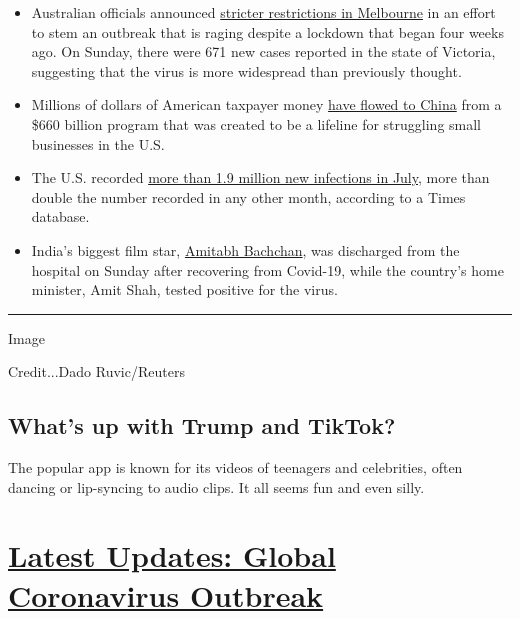 \begin{itemize}
\item
  Australian officials announced
  \href{https://www.nytimes3xbfgragh.onion/2020/08/02/world/coronavirus-covid-19.html?action=click\&module=Top\%20Stories\&pgtype=Homepage\#link-74f9a2b2}{stricter
  restrictions in Melbourne} in an effort to stem an outbreak that is
  raging despite a lockdown that began four weeks ago. On Sunday, there
  were 671 new cases reported in the state of Victoria, suggesting that
  the virus is more widespread than previously thought.
\item
  Millions of dollars of American taxpayer money
  \href{https://www.nytimes3xbfgragh.onion/2020/08/02/us/politics/virus-china-ppp-small-business-loans.html?action=click\&module=Top\%20Stories\&pgtype=Homepage}{have
  flowed to China} from a \$660 billion program that was created to be a
  lifeline for struggling small businesses in the U.S.
\item
  The U.S. recorded
  \href{https://www.nytimes3xbfgragh.onion/2020/08/02/world/coronavirus-covid-19.html}{more
  than 1.9 million new infections in July,} more than double the number
  recorded in any other month, according to a Times database.
\item
  India's biggest film star,
  \href{https://www.nytimes3xbfgragh.onion/2020/08/02/world/coronavirus-covid-19.html\#link-144c443a}{Amitabh
  Bachchan}, was discharged from the hospital on Sunday after recovering
  from Covid-19, while the country's home minister, Amit Shah, tested
  positive for the virus.
\end{itemize}

\begin{center}\rule{0.5\linewidth}{\linethickness}\end{center}

Image

Credit...Dado Ruvic/Reuters

\hypertarget{whats-up-with-trump-and-tiktok}{%
\subsection{What's up with Trump and
TikTok?}\label{whats-up-with-trump-and-tiktok}}

The popular app is known for its videos of teenagers and celebrities,
often dancing or lip-syncing to audio clips. It all seems fun and even
silly.

\hypertarget{latest-updates-global-coronavirus-outbreak}{%
\section{\texorpdfstring{\href{https://www.nytimes3xbfgragh.onion/2020/08/01/world/coronavirus-covid-19.html?action=click\&pgtype=Article\&state=default\&region=MAIN_CONTENT_1\&context=storylines_live_updates}{Latest
Updates: Global Coronavirus
Outbreak}}{Latest Updates: Global Coronavirus Outbreak}}\label{latest-updates-global-coronavirus-outbreak}}

